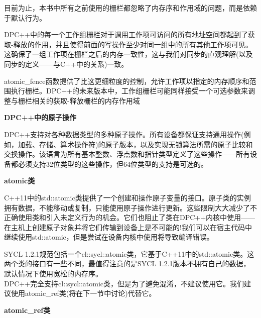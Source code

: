 目前为止，本书中所有之前使用的栅栏都忽略了内存序和作用域的问题，而是依赖于默认行为。\par

DPC++中的每一个工作组栅栏对于调用工作项可访问的所有地址空间都起到了获取-释放的作用，并且使得前面的写操作至少对同一组中的所有其他工作项可见。这确保了一组工作项在栅栏之后的内存一致性，这与我们对同步的直观理解(以及同步的定义——与C++中的关系)一致。\par

atomic\_fence函数提供了比这更细粒度的控制，允许工作项以指定的内存顺序和范围执行栅栏。DPC++的未来版本中，工作组栅栏可能同样接受一个可选参数来调整与栅栏相关的获取-释放栅栏的内存作用域\par

\hspace*{\fill} \par %
\textbf{DPC++中的原子操作}

DPC++支持对各种数据类型的多种原子操作。所有设备都保证支持通用操作(例如，加载、存储、算术操作符)的原子版本，以及实现无锁算法所需的原子比较和交换操作。该语言为所有基本整数、浮点数和指针类型定义了这些操作——所有设备都必须支持32位类型的这些操作，但64位类型的支持是可选的。\par

\hspace*{\fill} \par %
\textbf{atomic类}

C++11中的std::atomic类提供了一个创建和操作原子变量的接口。原子类的实例拥有数据，不能移动或复制，只能使用原子操作进行更新。这些限制大大减少了不正确使用类和引入未定义行为的机会。它们也阻止了类在DPC++内核中使用——在主机上创建原子对象并将它们传输到设备上是不可能的!我们可以在宿主代码中继续使用std::atomic，但是尝试在设备内核中使用将导致编译错误。\par

\begin{tcolorbox}[colback=blue!5!white,colframe=blue!75!black, title=原子类在SYCL 2020和DPC++中已弃用]
SYCL 1.2.1规范包括一个cl::sycl::atomic类，它基于C++11中的std::atomic类。这两个类的接口有一些不同，最值得注意的是SYCL 1.2.1版本不拥有自己的数据，默认情况下使用宽松的内存序。\\

DPC++完全支持cl::sycl::atomic类，但是为了避免混淆，不建议使用它。我们建议使用atomic\_ref类(将在下一节中讨论)代替它。
\end{tcolorbox}

\hspace*{\fill} \par %
\textbf{atomic\_ref类}

